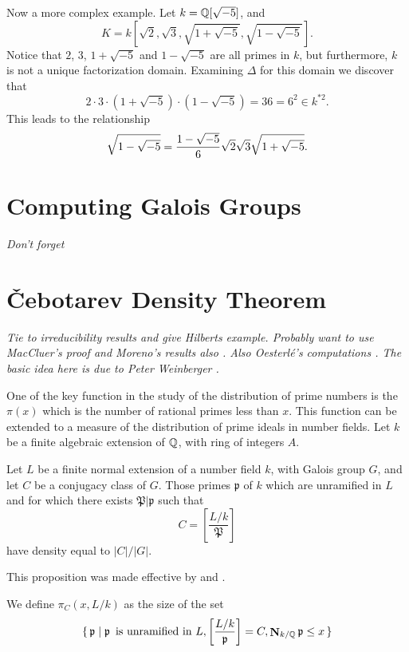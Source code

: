 \medskip
Now a more complex example.  Let $k = \mathbb{Q}[\sqrt{-5}]$, and 
\[
K = k[\sqrt{2}, \sqrt{3}, \sqrt{1+\sqrt{-5}}, \sqrt{1-\sqrt{-5}}].
\]
Notice that $2$, $3$, $1+\sqrt{-5}$ and $1-\sqrt{-5}$ are all primes in
$k$, but furthermore, $k$ is not a unique factorization domain.
Examining $\Delta$ for this domain we discover that
\[
2\cdot 3\cdot(1+\sqrt{-5})\cdot(1-\sqrt{-5})= 36 
  = 6^2 \in k^{\ast2}.
\]
This leads to the relationship
\[
\sqrt{1-\sqrt{-5}} 
  = {1 - \sqrt{-5} \over 6} \sqrt{2} \sqrt{3} \sqrt{1+\sqrt{-5}}.
\]

\section{Computing Galois Groups}

{\em Don't forget \cite{Mckay79}}

\section{\v{C}ebotarev Density Theorem}
\label{Cebotarev:Sec}

{\em Tie to irreducibility results and give Hilberts example.
Probably want to use MacCluer's proof \cite{MacCluer68} and Moreno's
results also \cite{Moreno_undated-rv}.  Also Oesterl\'e's computations
\cite{Oesterle1979-wo}.  The basic idea here is due to Peter Weinberger
\cite{Weinberger1984-cx}.} 


One of the key function in the study of the distribution of prime
numbers is the $\pi(x)$ which is the number of rational primes less
than $x$.  This function can be extended to a measure of the
distribution of prime ideals in number fields.  Let $k$ be a finite
algebraic extension of $\mathbb{Q}$, with ring of integers $A$.

\begin{proposition}[\Chebotarev] 
\label{Cebotarev:Density:Prop}
Let $L$ be a finite normal extension of a number field $k$, with Galois
group $G$, and let $C$ be a conjugacy class of $G$.  Those primes $\mathfrak{p}$ of $k$ which are unramified in $L$ and for which there exists $\mathfrak{P} |\mathfrak{p}$ such that
\[
C = \left[\frac{L/k}{\mathfrak{P}}\right]
\]
have density equal to $|C|/|G|$.
\end{proposition}

This proposition was made effective by {\Lagarias} and {\Odlyzko}
\cite{Lagarias1977-be}.

We define $\pi_{C}(x, L/k)$ as the size of the set
\[
\{\, {\mathfrak p} \mid {\mathfrak p} \enspace\mbox{is unramified in $L$},
\left[\frac{L/k}{\mathfrak p}\right] = C, \mathop{\mathbf{N}}\nolimits_{k/\mathbb{Q}}{\mathfrak p} \le x\,\}
\]

